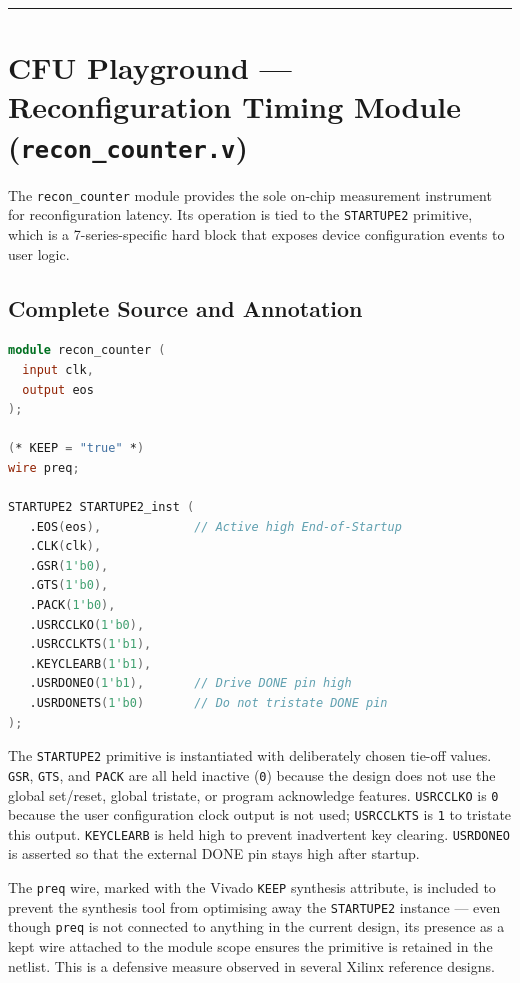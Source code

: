 \vspace{0.4em}\hrule\vspace{0.4em}

\section{CFU Playground — Reconfiguration Timing Module (\texttt{recon\_counter.v})}

The \texttt{recon\_counter} module provides the sole on-chip measurement instrument for reconfiguration latency. Its operation is tied to the \texttt{STARTUPE2} primitive, which is a 7-series-specific hard block that exposes device configuration events to user logic.

\subsection{Complete Source and Annotation}

\begin{lstlisting}[style=mystyle, language=Verilog]
module recon_counter (
  input clk,
  output eos
);

(* KEEP = "true" *)
wire preq;

STARTUPE2 STARTUPE2_inst (
   .EOS(eos),             // Active high End-of-Startup
   .CLK(clk),
   .GSR(1'b0),
   .GTS(1'b0),
   .PACK(1'b0),
   .USRCCLKO(1'b0),
   .USRCCLKTS(1'b1),
   .KEYCLEARB(1'b1),
   .USRDONEO(1'b1),       // Drive DONE pin high
   .USRDONETS(1'b0)       // Do not tristate DONE pin
);
\end{lstlisting}

The \texttt{STARTUPE2} primitive is instantiated with deliberately chosen tie-off values. \texttt{GSR}, \texttt{GTS}, and \texttt{PACK} are all held inactive (\texttt{0}) because the design does not use the global set/reset, global tristate, or program acknowledge features. \texttt{USRCCLKO} is \texttt{0} because the user configuration clock output is not used; \texttt{USRCCLKTS} is \texttt{1} to tristate this output. \texttt{KEYCLEARB} is held high to prevent inadvertent key clearing. \texttt{USRDONEO} is asserted so that the external DONE pin stays high after startup.

The \texttt{preq} wire, marked with the Vivado \texttt{KEEP} synthesis attribute, is included to prevent the synthesis tool from optimising away the \texttt{STARTUPE2} instance — even though \texttt{preq} is not connected to anything in the current design, its presence as a kept wire attached to the module scope ensures the primitive is retained in the netlist. This is a defensive measure observed in several Xilinx reference designs.

